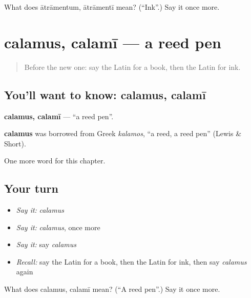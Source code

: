 \begin{tcolorbox}[breakable,colback=teal!4,colframe=teal!35!black,title={Before you move on}]
What does ātrāmentum, ātrāmentī mean? (\textquotedblleft{}Ink\textquotedblright{}.) Say it once more.
\end{tcolorbox}
\section[calamus, calamī]{calamus, calamī — a reed pen}

\label{lesson:LA-C124-calamus}



\begin{quote}
Before the new one: say the Latin for a book, then the Latin for ink.
\end{quote}

\subsection*{You'll want to know: calamus, calamī}
\textbf{calamus, calamī} — \textquotedblleft{}a reed pen\textquotedblright{}.

\begin{cousinweb}
\textbf{calamus} was borrowed from Greek \emph{kalamos}, \textquotedblleft{}a reed, a reed pen\textquotedblright{} (Lewis \& Short).
\end{cousinweb}

\begin{grammarlens}[title={What you've built}]
One more word for this chapter.
\end{grammarlens}

\subsection*{Your turn}
\begin{itemize}
\raggedright
  \item \emph{Say it:} \emph{calamus}
  \item \emph{Say it:} \emph{calamus}, once more
  \item \emph{Say it:} say \emph{calamus}
  \item \emph{Recall:} say the Latin for a book, then the Latin for ink, then say \emph{calamus} again
\end{itemize}

\begin{tcolorbox}[breakable,colback=teal!4,colframe=teal!35!black,title={Before you move on}]
What does calamus, calamī mean? (\textquotedblleft{}A reed pen\textquotedblright{}.) Say it once more.
\end{tcolorbox}
